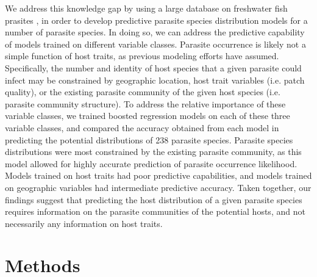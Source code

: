 \documentclass[12pt]{article}
\begin{document}
   
 We address this knowledge gap by using a large database on freshwater fish prasites \citep{strona2013}, in order to develop predictive parasite species distribution models for a number of parasite species. In doing so, we can address the predictive capability of models trained on different variable classes. Parasite occurrence is likely not a simple function of host traits, as previous modeling efforts have assumed. Specifically, the number and identity of host species that a given parasite could infect may be constrained by geographic location, host trait variables (i.e. patch quality), or the existing parasite community of the given host species (i.e. parasite community structure). To address the relative importance of these variable classes, we trained boosted regression models on each of these three variable classes, and compared the accuracy obtained from each model in predicting the potential distributions of 238 parasite species. Parasite species distributions were most constrained by the existing parasite community, as this model allowed for highly accurate prediction of parasite occurrence likelihood. Models trained on host traits had poor predictive capabilities, and models trained on geographic variables had intermediate predictive accuracy. Taken together, our findings suggest that predicting the host distribution of a given parasite species requires information on the parasite communities of the potential hosts, and not necessarily any information on host traits. 
  
 



 
\section*{Methods}
\end{document}
